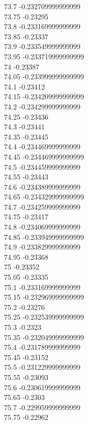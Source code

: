 {73.7	-0.232709999999999\\
73.75	-0.23295\\
73.8	-0.233169999999999\\
73.85	-0.23337\\
73.9	-0.233549999999999\\
73.95	-0.233719999999999\\
74	-0.23387\\
74.05	-0.233999999999999\\
74.1	-0.23412\\
74.15	-0.234209999999999\\
74.2	-0.234299999999999\\
74.25	-0.23436\\
74.3	-0.23441\\
74.35	-0.23445\\
74.4	-0.234469999999999\\
74.45	-0.234469999999999\\
74.5	-0.234459999999999\\
74.55	-0.23443\\
74.6	-0.234389999999999\\
74.65	-0.234329999999999\\
74.7	-0.234259999999999\\
74.75	-0.23417\\
74.8	-0.234069999999999\\
74.85	-0.233949999999999\\
74.9	-0.233829999999999\\
74.95	-0.23368\\
75	-0.23352\\
75.05	-0.23335\\
75.1	-0.233169999999999\\
75.15	-0.232969999999999\\
75.2	-0.23276\\
75.25	-0.232539999999999\\
75.3	-0.2323\\
75.35	-0.232049999999999\\
75.4	-0.231789999999999\\
75.45	-0.23152\\
75.5	-0.231229999999999\\
75.55	-0.23093\\
75.6	-0.230619999999999\\
75.65	-0.2303\\
75.7	-0.229959999999999\\
75.75	-0.22962\\
}
